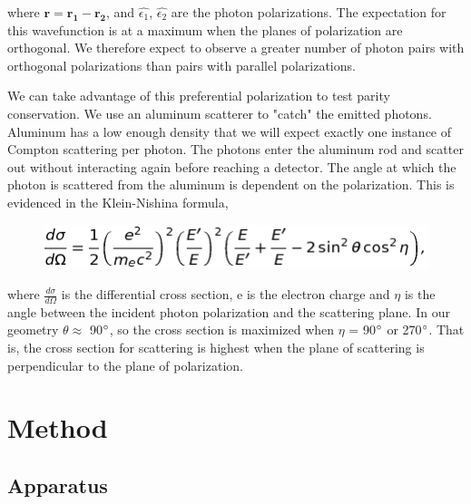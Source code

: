 \documentclass{article}
\renewcommand{\vec}[1]{\mathbf{#1}}
\begin{document}
where $\vec{r = r_1 - r_2}$, and $\hat{\epsilon_1}$, $\hat{\epsilon_2}$ are the photon polarizations. The expectation for this wavefunction is at a maximum when the planes of polarization are orthogonal. We therefore expect to observe a greater number of photon pairs with orthogonal polarizations than pairs with parallel polarizations.

\hspace{.25cm}

We can take advantage of this preferential polarization to test parity conservation. We use an aluminum scatterer to "catch" the emitted photons. Aluminum has a low enough density that we will expect exactly one instance of Compton scattering per photon. The photons enter the aluminum rod and scatter out without interacting again before reaching a detector. The angle at which the photon is scattered from the aluminum is dependent on the polarization. This is evidenced in the Klein-Nishina formula,

\begin{figure}[!htb]
	\centering
	\includegraphics[scale=.5]{eqn_6.png}
 	\label{klein}
\end{figure}

where $\frac{d\sigma}{d\Omega}$ is the differential cross section, e is the electron charge and $\eta$ is the angle between the incident photon polarization and the scattering plane. In our geometry $\theta \approx$  90$\degree$, so the cross section is maximized when $\eta$ = 90$\degree$ or 270$\degree$. That is, the cross section for scattering is highest when the plane of scattering is perpendicular to the plane of polarization.

\section{Method}
\subsection{Apparatus}
\end{document}
